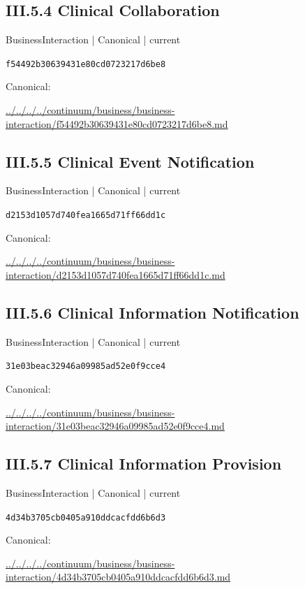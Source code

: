 \documentclass[10pt,a4paper]{article}
\begin{document}
\subsection*{III.5.4 Clinical Collaboration}
\label{element-f54492b30639431e80cd0723217d6be8}
{\small BusinessInteraction | Canonical | current}\par
\texttt{f54492b30639431e80cd0723217d6be8}\par
Canonical: \par
{\footnotesize\url{../../../../continuum/business/business-interaction/f54492b30639431e80cd0723217d6be8.md}}\par
\subsection*{III.5.5 Clinical Event Notification}
\label{element-d2153d1057d740fea1665d71ff66dd1c}
{\small BusinessInteraction | Canonical | current}\par
\texttt{d2153d1057d740fea1665d71ff66dd1c}\par
Canonical: \par
{\footnotesize\url{../../../../continuum/business/business-interaction/d2153d1057d740fea1665d71ff66dd1c.md}}\par
\subsection*{III.5.6 Clinical Information Notification}
\label{element-31e03beac32946a09985ad52e0f9cce4}
{\small BusinessInteraction | Canonical | current}\par
\texttt{31e03beac32946a09985ad52e0f9cce4}\par
Canonical: \par
{\footnotesize\url{../../../../continuum/business/business-interaction/31e03beac32946a09985ad52e0f9cce4.md}}\par
\subsection*{III.5.7 Clinical Information Provision}
\label{element-4d34b3705cb0405a910ddcacfdd6b6d3}
{\small BusinessInteraction | Canonical | current}\par
\texttt{4d34b3705cb0405a910ddcacfdd6b6d3}\par
Canonical: \par
{\footnotesize\url{../../../../continuum/business/business-interaction/4d34b3705cb0405a910ddcacfdd6b6d3.md}}\par
\end{document}
